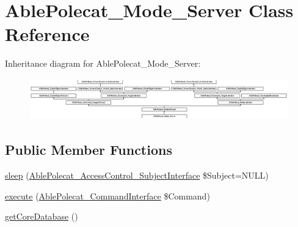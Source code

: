 \hypertarget{class_able_polecat___mode___server}{}\section{Able\+Polecat\+\_\+\+Mode\+\_\+\+Server Class Reference}
\label{class_able_polecat___mode___server}
Inheritance diagram for Able\+Polecat\+\_\+\+Mode\+\_\+\+Server\+:\begin{figure}[H]
\begin{center}
\leavevmode
\includegraphics[height=1.806452cm]{class_able_polecat___mode___server}
\end{center}
\end{figure}
\subsection*{Public Member Functions}
\begin{DoxyCompactItemize}
\item 
\hyperlink{class_able_polecat___mode___server_a365e24d7b066205cafa2a5cce3a4f224}{sleep} (\hyperlink{interface_able_polecat___access_control___subject_interface}{Able\+Polecat\+\_\+\+Access\+Control\+\_\+\+Subject\+Interface} \$Subject=N\+U\+L\+L)
\item 
\hyperlink{class_able_polecat___mode___server_aa7f01cbd17bffdbbb7511a3c37756064}{execute} (\hyperlink{interface_able_polecat___command_interface}{Able\+Polecat\+\_\+\+Command\+Interface} \$Command)
\item 
\hyperlink{class_able_polecat___mode___server_a9585fbac2aec4e691bf7c5b9031a0fd3}{get\+Core\+Database} ()
\end{DoxyCompactItemize}
